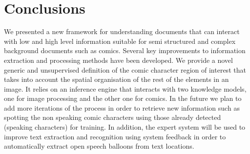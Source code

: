 




\section{Conclusions}
\label{sec:kn:conclusion}

We presented a new framework for understanding documents that can interact with low and high level information suitable for semi structured and complex background documents such as comics.
Several key improvements to information extraction and processing methods have been developed. 
We provide a novel generic and unsupervised definition of the comic character region of interest that takes into account the spatial organisation of the rest of the elements in an image.
It relies on an inference engine that interacts with two knowledge models, one for image processing and the other one for comics.
In the future we plan to add more iterations of the process in order to retrieve new information such as spotting the non speaking comic characters using those already detected (speaking characters) for training.
In addition, the expert system will be used to improve text extraction and recognition using system feedback in order to automatically extract open speech balloons from text locations. 

